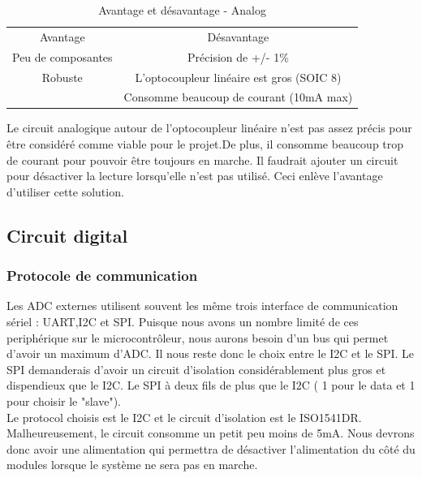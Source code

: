 					\begin{table}[h!]
					\centering
						\begin{tabular}{|c|c|}
							\hline
							Avantage & D\'{e}savantage\\ \hhline{|=|=|}
							Peu de composantes & Pr\'{e}cision de +/- 1\% \\ \hline
							Robuste & L'optocoupleur lin\'{e}aire est gros (SOIC 8)\\ \hline
							 & Consomme beaucoup de courant (10mA max)\\ \hline
						\end{tabular}
						\caption{Avantage et d\'{e}savantage - Analog}
					\end{table} 
					
				Le circuit analogique autour de l'optocoupleur lin\'{e}aire n'est pas assez pr\'{e}cis pour \^{e}tre consid\'{e}r\'{e} comme viable pour le projet.De plus, il consomme beaucoup trop de courant pour pouvoir \^{e}tre toujours en marche. Il faudrait ajouter un circuit pour d\'{e}sactiver la lecture lorsqu'elle n'est pas utilis\'{e}. Ceci enl\`{e}ve l'avantage d'utiliser cette solution. 
				\newpage
				
			\subsection{Circuit digital}
				\subsubsection{Protocole de communication}
					Les ADC externes utilisent souvent les m\^{e}me trois interface de communication s\'{e}riel : UART,I2C et SPI. Puisque nous avons un nombre limit\'{e} de ces periph\'{e}rique sur le microcontr\^{o}leur, nous aurons besoin d'un bus qui permet d'avoir un maximum d'ADC. Il nous reste donc le choix entre le I2C et le SPI. Le SPI demanderais d'avoir un circuit d'isolation consid\'{e}rablement plus gros et dispendieux que le I2C. Le SPI \`{a} deux fils de plus que le I2C ( 1 pour le data et 1 pour choisir le "slave"). \\
					Le protocol choisis est le I2C et le circuit d'isolation est le ISO1541DR. Malheureusement, le circuit consomme un petit peu moins de 5mA. Nous devrons donc avoir une alimentation qui permettra de d\'{e}sactiver l'alimentation du c\^{o}t\'{e} du modules lorsque le syst\`{e}me ne sera pas en marche.
					
